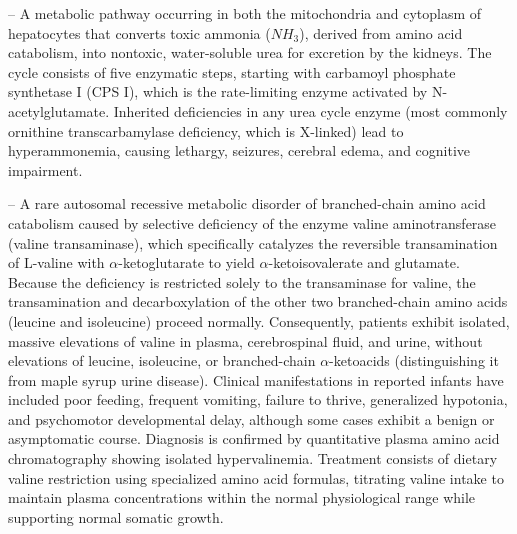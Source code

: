 -- A metabolic pathway occurring in both the mitochondria and cytoplasm of hepatocytes that converts toxic ammonia ($NH_3$), derived from amino acid catabolism, into nontoxic, water-soluble urea for excretion by the kidneys. The cycle consists of five enzymatic steps, starting with carbamoyl phosphate synthetase I (CPS I), which is the rate-limiting enzyme activated by N-acetylglutamate. Inherited deficiencies in any urea cycle enzyme (most commonly ornithine transcarbamylase deficiency, which is X-linked) lead to hyperammonemia, causing lethargy, seizures, cerebral edema, and cognitive impairment.

-- A rare autosomal recessive metabolic disorder of branched-chain amino acid catabolism caused by selective deficiency of the enzyme valine aminotransferase (valine transaminase), which specifically catalyzes the reversible transamination of L-valine with $\alpha$-ketoglutarate to yield $\alpha$-ketoisovalerate and glutamate. Because the deficiency is restricted solely to the transaminase for valine, the transamination and decarboxylation of the other two branched-chain amino acids (leucine and isoleucine) proceed normally. Consequently, patients exhibit isolated, massive elevations of valine in plasma, cerebrospinal fluid, and urine, without elevations of leucine, isoleucine, or branched-chain $\alpha$-ketoacids (distinguishing it from maple syrup urine disease). Clinical manifestations in reported infants have included poor feeding, frequent vomiting, failure to thrive, generalized hypotonia, and psychomotor developmental delay, although some cases exhibit a benign or asymptomatic course. Diagnosis is confirmed by quantitative plasma amino acid chromatography showing isolated hypervalinemia. Treatment consists of dietary valine restriction using specialized amino acid formulas, titrating valine intake to maintain plasma concentrations within the normal physiological range while supporting normal somatic growth.

